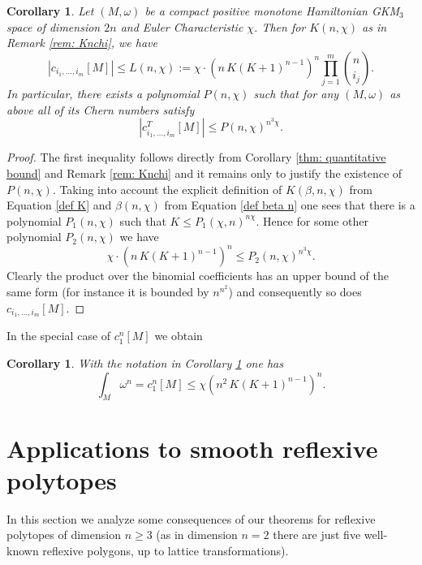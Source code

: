 \documentclass[12pt,a4paper]{amsart}
\newtheorem{cor}[thm]{Corollary}
\theoremstyle{plain}
\theoremstyle{definition}
\begin{document}
\begin{cor}\label{cor: quantitativeboundgeometric}
Let $(M,\omega)$ be a compact positive monotone Hamiltonian GKM$_3$ space of dimension $2n$ and Euler Characteristic $\chi$. Then for $K(n,\chi)$ as in Remark \ref{rem: Knchi}, we have
\begin{equation}\label{eq def L geometric}
|c_{i_1,\ldots,i_m}[M]|\leq L(n,\chi):=\chi\cdot (n\,K (K+1)^{n-1})^n\prod_{j=1}^m {n\choose i_j}.
\end{equation}
In particular, there exists a polynomial $P(n,\chi)$ such that for any $(M,\omega)$ as above all of its Chern numbers satisfy \[|c^T_{i_1,\ldots,i_m}[M]| \leq P(n,\chi)^{n^3\chi}.\]
\end{cor}
\begin{proof}
The first inequality follows directly from Corollary \ref{thm: quantitative bound} and Remark \ref{rem: Knchi} and it remains only to justify the existence of $P(n,\chi)$. Taking into account the explicit definition of $K(\beta,n,\chi)$ from Equation \eqref{def K} and $\beta(n,\chi)$ from Equation \eqref{def beta n} one sees that there is a polynomial $P_1(n,\chi)$ such that $K\leq P_1(\chi,n)^{n\chi}$. Hence for some other polynomial $P_2(n,\chi)$ we have
\[\chi\cdot (n\,K (K+1)^{n-1})^n\leq P_2(n,\chi)^{n^3\chi}.\]
Clearly the product over the binomial coefficients has an upper bound of the same form (for instance it is bounded by $n^{n^2}$) and consequently so does $c_{i_1,\ldots,i_m}[M]$.
\end{proof}


In the special case of $c_1^n[M]$ we obtain

\begin{cor}\label{bound on the volume}
With the notation in Corollary \ref{cor: quantitativeboundgeometric} one has
\[ \int_M \omega^n=c_1^n[M]\leq \chi (n^2\,K (K+1)^{n-1})^n.\]
\end{cor}


\section{Applications to smooth reflexive polytopes}\label{sec application reflexive}
In this section we analyze some consequences of our theorems for reflexive polytopes of dimension $n\geq 3$ (as in dimension
$n=2$ there are just five well-known reflexive polygons, up to lattice transformations).
\end{document}
